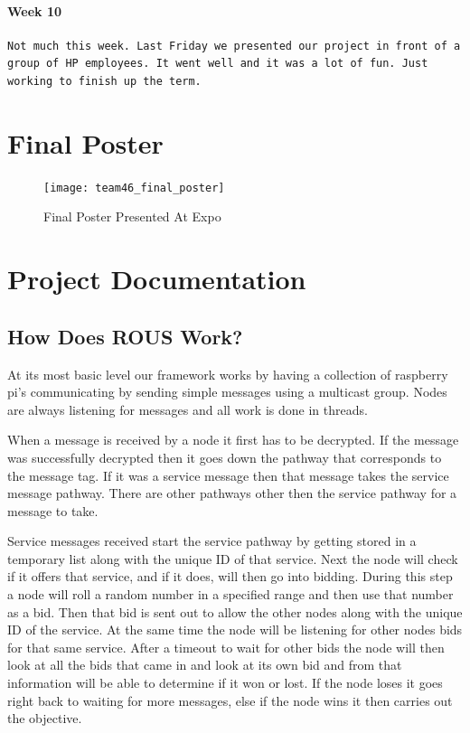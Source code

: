 \documentclass[draftclsnofoot, onecolumn, compsoc, 10pt]{IEEEtran}
\begin{document}
\paragraph{Week 10}
\begin{lstlisting}
Not much this week. Last Friday we presented our project in front of a group of HP employees. It went well and it was a lot of fun. Just working to finish up the term.
\end{lstlisting}

\section{Final Poster}
\begin{figure}
    \centering
    \texttt{[image: team46\_final\_poster]}
    \caption{Final Poster Presented At Expo}
    \label{fig:my_label}
\end{figure}


\section{Project Documentation}
\subsection{How Does ROUS Work?}
At its most basic level our framework works by having a collection of raspberry pi's communicating by sending simple messages using a multicast group. Nodes are always listening for messages and all work is done in threads.

When a message is received by a node it first has to be decrypted. If the message was successfully decrypted then it goes down the pathway that corresponds to the message tag. If it was a service message then that message takes the service message pathway. There are other pathways other then the service pathway for a message to take.

Service messages received start the service pathway by getting stored in a temporary list along with the unique ID of that service. Next the node will check if it offers that service, and if it does, will then go into bidding. During this step a node will roll a random number in a specified range and then use that number as a bid. Then that bid is sent out to allow the other nodes along with the unique ID of the service. At the same time the node will be listening for other nodes bids for that same service. After a timeout to wait for other bids the node will then look at all the bids that came in and look at its own bid and from that information will be able to determine if it won or lost. If the node loses it goes right back to waiting for more messages, else if the node wins it then carries out the objective.
\end{document}
